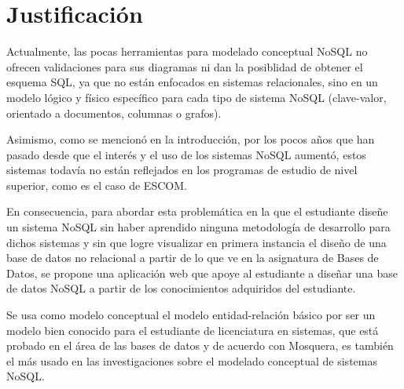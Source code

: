 \section{Justificación}

Actualmente, las pocas herramientas para modelado conceptual NoSQL no ofrecen validaciones para sus diagramas ni dan la posiblidad de obtener el esquema SQL, ya que no están enfocados en sistemas relacionales, sino en un modelo lógico y físico específico para cada tipo de sistema NoSQL (clave-valor, orientado a documentos, columnas o grafos).


Asimismo, como se mencionó en la introducción, por los pocos años que han pasado desde que el interés y el uso de los sistemas NoSQL aumentó, estos sistemas todavía no están reflejados en los programas de estudio de nivel superior, como es el caso de ESCOM.


En consecuencia, para abordar esta problemática en la que el estudiante diseñe un sistema NoSQL sin haber aprendido ninguna metodología de desarrollo para dichos sistemas y sin que logre visualizar en primera instancia el diseño de una base de datos no relacional a partir de lo que ve en la asignatura de Bases de Datos, se propone una aplicación web que apoye al estudiante a diseñar una base de datos NoSQL a partir de los conocimientos adquiridos del estudiante.


Se usa como modelo conceptual el modelo entidad-relación básico por ser un modelo bien conocido para el estudiante de licenciatura en sistemas, que está probado en el área de las bases de datos y de acuerdo con Mosquera\cite{martinez-mosquera_modeling_2020}, es también el más usado en las investigaciones sobre el modelado conceptual de sistemas NoSQL.

